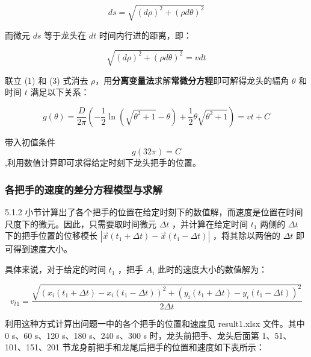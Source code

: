 \documentclass[a4paper]{article}
\begin{document}
		$$ ds = \sqrt{(d\rho)^2 + (\rho d\theta) ^ 2}$$

		而微元 $ds$ 等于龙头在 $dt$ 时间内行进的距离，即：

		\begin{equation}
			\sqrt{(d\rho)^2 + (\rho d\theta) ^ 2} = vdt
		\end{equation}

		联立 (1) 和 (3) 式消去 $\rho$，用\textbf{分离变量法}求解\textbf{常微分方程}即可解得龙头的辐角 $\theta$ 和时间 $t$ 满足以下关系：

		\begin{equation}
			g(\theta) = \frac{D}{2\pi}(-\frac{1}{2}\ln(\sqrt{\theta^2+1}-\theta)+\frac{1}{2}\theta\sqrt{\theta^2+1})=vt+C
		\end{equation}


		带入初值条件$$g(32  \pi) = C$$,利用数值计算即可求得给定时刻下龙头把手的位置。

	\subsubsection{各把手的速度的差分方程模型与求解}

		5.1.2 小节计算出了各个把手的位置在给定时刻下的数值解，而速度是位置在时间尺度下的微元。因此，只需要取时间微元 $\Delta t$ ，并计算在给定时间 $t_1$ 两侧的 $\Delta t$ 下的把手位置的位移模长 $|\vec{x}(t_1+\Delta t) - \vec{x}(t_1 - \Delta t)|$ ，将其除以两倍的 $\Delta t$ 即可得到速度大小。



		具体来说，对于给定的时间 $t_1$ ，把手 $A_i$ 此时的速度大小的数值解为：

		\begin{equation}
			v_{t1} = \frac{\sqrt{(x_i(t_1 + \Delta t) - x_i(t_1 - \Delta t))^2 + (y_i(t_1 + \Delta t) - y_i(t_1 - \Delta t))^2}}{2\Delta t}
		\end{equation}


		利用这种方式计算出问题一中的各个把手的位置和速度见 result1.xlsx 文件。其中 0 s、60 s、120 s、180 s、240 s、300 s 时，龙头前把手、龙头后面第 1、51、101、151、201 节龙身前把手和龙尾后把手的位置和速度如下表所示：
\end{document}
